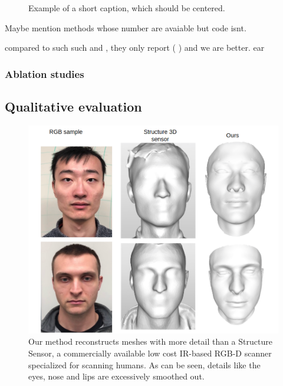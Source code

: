 \documentclass[10pt,twocolumn,letterpaper]{article}
\begin{document}
\begin{figure}
\begin{center}
\fbox{\rule{0pt}{5in} \rule{.9\linewidth}{0pt}}
\end{center}
   \caption{Example of a short caption, which should be centered.}
\label{fig:short}
\end{figure}


Maybe mention methods whose number are avaiable but code isnt.

compared to such such and , they only report ( ) and we are better. 
ear     
\subsubsection{Ablation studies}

\subsection{Qualitative evaluation}
\begin{figure}[t]
\begin{center}
   \includegraphics[width=0.9\linewidth]{images/struc_3d_comp.png}
\end{center}
   \caption{Our method reconstructs meshes with more detail than a Structure Sensor, a commercially available low cost IR-based RGB-D scanner \cite{structure2019} specialized for scanning humans. As can be seen, details like the eyes, nose and lips are excessively smoothed out.}
\label{fig:long}
\label{fig:onecol}
\end{figure}
\end{document}
